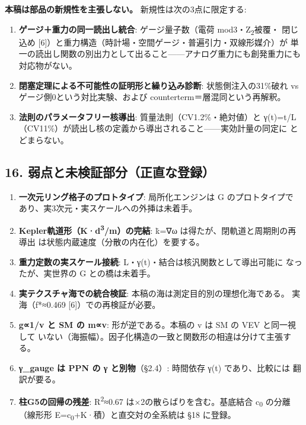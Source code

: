 \documentclass[
]{ltjarticle}
\providecommand{\tightlist}{%
  \setlength{\itemsep}{0pt}\setlength{\parskip}{0pt}}
\begin{document}
\textbf{本稿は部品の新規性を主張しない。} 新規性は次の3点に限定する:

\begin{enumerate}
\def\labelenumi{\arabic{enumi}.}
\tightlist
\item
  \textbf{ゲージ＋重力の同一読出し統合}: ゲージ量子数（電荷
  mod3・Z\textsubscript{2}被覆・ 閉じ込め
  {[}6{]}）と重力構造（時計場・空間ゲージ・普遍引力・双線形媒介）が
  単一の読出し関数の別出力として出ること------アナログ重力にも創発重力にも
  対応物がない。
\item
  \textbf{閉塞定理による不可能性の証明形と繰り込み診断}:
  状態側注入の31\%破れ vs ゲージ側0という対比実験、および
  counterterm＝層混同という再解釈。
\item
  \textbf{法則のパラメータフリー核導出}: 質量法則（CV1.2\%・絶対値）と
  γ(t)=t/L（CV11\%）が読出し核の定義から導出されること------実効計量の同定に
  とどまらない。
\end{enumerate}

\subsection{16.
弱点と未検証部分（正直な登録）}\label{ux5f31ux70b9ux3068ux672aux691cux8a3cux90e8ux5206ux6b63ux76f4ux306aux767bux9332}

\begin{enumerate}
\def\labelenumi{\arabic{enumi}.}
\tightlist
\item
  \textbf{一次元リング格子のプロトタイプ}: 局所化エンジンは G
  のプロトタイプで あり、実3次元・実スケールへの外挿は未着手。
\item
  \textbf{Kepler軌道形（K·d\textsuperscript{3}/m）の完結}: k̇=∇ω
  は得たが、閉軌道と周期則の再導出
  は状態内蔵速度（分散の内在化）を要する。
\item
  \textbf{重力定数の実スケール接続}:
  L・γ(t)・結合は核汎関数として導出可能に なったが、実世界の G
  との橋は未着手。
\item
  \textbf{実テクスチャ海での統合検証}:
  本稿の海は測定目的別の理想化海である。 実海（f*≈0.469
  {[}6{]}）での再検証が必要。
\item
  \textbf{g∝1/v と SM の m∝v}: 形が逆である。本稿の v は SM の VEV
  と同一視して
  いない（海振幅）。因子化構造の一致と関数形の相違は分けて主張する。
\item
  \textbf{γ\_gauge は PPN の γ と別物}（§2.4）: 時間依存 γ(t)
  であり、比較には 翻訳が要る。
\item
  \textbf{柱G5の回帰の残差}: R\textsuperscript{2}≈0.67
  は×2の散らばりを含む。基底結合 c\textsubscript{0} の分離 （線形形
  E=c\textsubscript{0}+K·積）と直交対の全系統は §18 に登録。
\end{enumerate}
\end{document}

